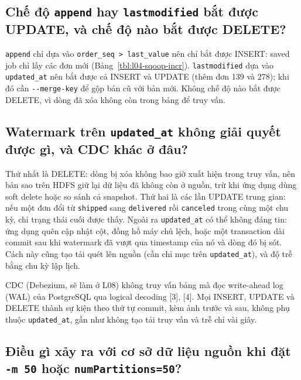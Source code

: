 \documentclass[
  12pt,
  a4paper,
]{report}
\begin{document}
\subsection{\texorpdfstring{Chế độ \texttt{append} hay
\texttt{lastmodified} bắt được UPDATE, và chế độ nào bắt được
DELETE?}{Chế độ append hay lastmodified bắt được UPDATE, và chế độ nào bắt được DELETE?}}\label{sec:l04-q5}

\texttt{append} chỉ dựa vào
\texttt{order\_}\allowbreak{}\texttt{seq\ \textgreater{}\ last\_}\allowbreak{}\texttt{value}\allowbreak{}
nên chỉ bắt được INSERT: saved job chỉ lấy các đơn mới
(Bảng~\ref{tbl:l04-sqoop-incr}). \texttt{lastmodified} dựa vào
\texttt{updated\_at} nên bắt được cả INSERT và UPDATE (thêm đơn 139 và
278); khi đó cần \texttt{-\/-merge-key} để gộp bản cũ với bản mới. Không
chế độ nào bắt được DELETE, vì dòng đã xóa không còn trong bảng để truy
vấn.

\subsection{\texorpdfstring{Watermark trên \texttt{updated\_at} không
giải quyết được gì, và CDC khác ở
đâu?}{Watermark trên updated\_at không giải quyết được gì, và CDC khác ở đâu?}}\label{sec:l04-q6}

Thứ nhất là DELETE: dòng bị xóa không bao giờ xuất hiện trong truy vấn,
nên bản sao trên HDFS giữ lại dữ liệu đã không còn ở nguồn, trừ khi ứng
dụng dùng soft delete hoặc so sánh cả snapshot. Thứ hai là các lần
UPDATE trung gian: nếu một đơn đổi từ \texttt{shipped} sang
\texttt{delivered} rồi \texttt{canceled} trong cùng một chu kỳ, chỉ
trạng thái cuối được thấy. Ngoài ra \texttt{updated\_at} có thể không
đáng tin: ứng dụng quên cập nhật cột, đồng hồ máy chủ lệch, hoặc một
transaction dài commit sau khi watermark đã vượt qua timestamp của nó và
dòng đó bị sót. Cách này cũng tạo tải quét lên nguồn (cần chỉ mục trên
\texttt{updated\_at}), và độ trễ bằng chu kỳ lập lịch.

CDC (Debezium, sẽ làm ở L08) không truy vấn bảng mà đọc write-ahead log
(WAL) của PostgreSQL qua logical decoding {[}3{]}, {[}4{]}. Mọi INSERT,
UPDATE và DELETE thành sự kiện theo thứ tự commit, kèm ảnh trước và sau,
không phụ thuộc \texttt{updated\_at}, gần như không tạo tải truy vấn và
trễ chỉ vài giây.

\subsection{\texorpdfstring{Điều gì xảy ra với cơ sở dữ liệu nguồn khi
đặt \texttt{-m\ 50} hoặc
\texttt{numPartitions=}\allowbreak{}\texttt{50}\allowbreak{}?}{Điều gì xảy ra với cơ sở dữ liệu nguồn khi đặt -m 50 hoặc numPartitions=50?}}\label{sec:l04-q7}
\end{document}
